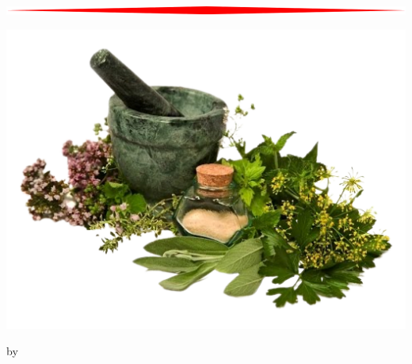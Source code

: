 
\begin{titlepage}
    \begin{onecolumn}
        \begin{center}
            {\Huge \booktitle}
            
            \vspace{0.5cm}
            \includegraphics[width=\textwidth]{images/hr.png}
            
            \vspace{0.5cm}
            {\huge \booksubtitle}
            
            \vspace{0.5cm}

            \includegraphics[width=\textwidth]{images/herbs.png}
            
            \vspace{0.5cm}
            
            \vspace{0.5cm}

            
            \vfill
            {\Large by \bookauthor}
            
        \end{center}
    \end{onecolumn}
\end{titlepage}
\clearpage

\setcounter{tocdepth}{2} %
\tableofcontents